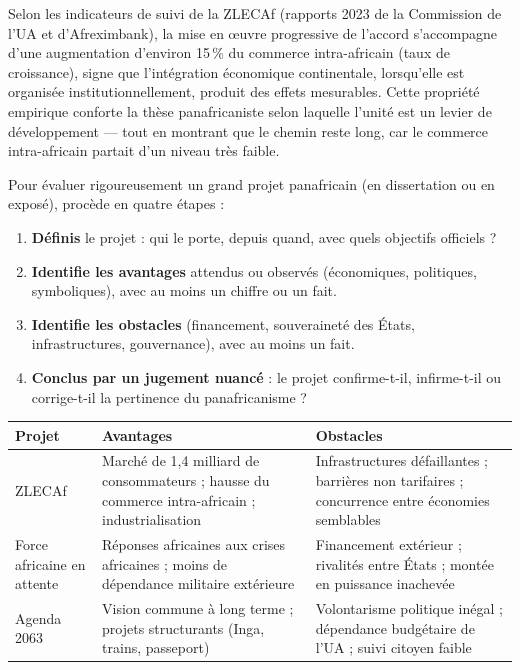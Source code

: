 \documentclass[11pt]{article}
\begin{document}
\begin{propriete}
Selon les indicateurs de suivi de la ZLECAf (rapports 2023 de la Commission de l'UA et d'Afreximbank), la mise en œuvre progressive de l'accord s'accompagne d'une augmentation d'environ 15\,\% du commerce intra-africain (taux de croissance), signe que l'intégration économique continentale, lorsqu'elle est organisée institutionnellement, produit des effets mesurables. Cette propriété empirique conforte la thèse panafricaniste selon laquelle l'unité est un levier de développement — tout en montrant que le chemin reste long, car le commerce intra-africain partait d'un niveau très faible.
\end{propriete}

\begin{methode}
Pour évaluer rigoureusement un grand projet panafricain (en dissertation ou en exposé), procède en quatre étapes :
\begin{enumerate}
\item \textbf{Définis} le projet : qui le porte, depuis quand, avec quels objectifs officiels ?
\item \textbf{Identifie les avantages} attendus ou observés (économiques, politiques, symboliques), avec au moins un chiffre ou un fait.
\item \textbf{Identifie les obstacles} (financement, souveraineté des États, infrastructures, gouvernance), avec au moins un fait.
\item \textbf{Conclus par un jugement nuancé} : le projet confirme-t-il, infirme-t-il ou corrige-t-il la pertinence du panafricanisme ?
\end{enumerate}
\end{methode}

\begin{center}
\begin{tabularx}{\linewidth}{|l|X|X|}
\hline
\rowcolor{popblueL} \textbf{Projet} & \textbf{Avantages} & \textbf{Obstacles} \\
\hline
ZLECAf & Marché de 1,4 milliard de consommateurs ; hausse du commerce intra-africain ; industrialisation & Infrastructures défaillantes ; barrières non tarifaires ; concurrence entre économies semblables \\
\hline
Force africaine en attente & Réponses africaines aux crises africaines ; moins de dépendance militaire extérieure & Financement extérieur ; rivalités entre États ; montée en puissance inachevée \\
\hline
Agenda 2063 & Vision commune à long terme ; projets structurants (Inga, trains, passeport) & Volontarisme politique inégal ; dépendance budgétaire de l'UA ; suivi citoyen faible \\
\hline
\end{tabularx}
\end{center}
\end{document}
